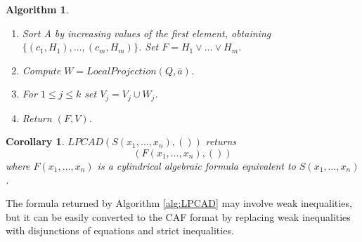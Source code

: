 \documentclass[english]{amsart}
\numberwithin{equation}{section}
\numberwithin{figure}{section}
\newtheorem{algorithm}[thm]{Algorithm}
\newtheorem{cor}[thm]{Corollary}
\begin{document}
\begin{algorithm}
\begin{enumerate}
\begin{enumerate}
\begin{enumerate}
\item $s_{1}=Root_{x_{k+1},p_{1}}f_{1}$ and $f_{1}\in W_{k+1}$ or $s_{1}=f_{1}\equiv-\infty$, 
\item $s_{2}=Root_{x_{k+1},p_{2}}f_{2}$ and $f_{2}\in W_{k+1}$ or $s_{2}=f_{2}\equiv\infty$, 
\item $v_{1}=s_{1}(\overline{a})$ and $v_{2}=s_{2}(\overline{a})$, 
\item either $v_{1}=v_{2}=a_{k+1}$ or $v_{1}<a_{k+1}<v_{2}$ and there
are no roots of elements of $W_{k+1}$ in $(v_{1},v_{2})$. 
\end{enumerate}
\item Set $Q=Q\cup(\{f_{1},f_{2}\}\setminus\{-\infty,\infty\})$.
\item If $v_{1}=v_{2}$ then set $G=(x_{k+1}=s_{1})$, add \[
(v_{1},s_{1},<,u_{2},r_{2},\rho_{2})\]
 and \[
(u_{1},r_{1},\rho_{1},v_{1},s_{1},<)\]
 to $stack$, and go to $(n)$.
\item If $u_{2}<v_{2}$ then set $t_{2}=r_{2}$ and $\sigma_{2}=\rho_{2}$.
Else set $t_{2}=s_{2}$ and $\sigma_{2}=<$, and if $u_{2}>v_{2}$
or $\rho_{2}=\leq$ add \[
(v_{2},s_{2},\leq,u_{2},r_{2},\rho_{2})\]
 to $stack$. 
\item If $v_{1}<u_{1}$ then set $t_{1}=r_{1}$ and $\sigma_{1}=\rho_{1}$.
Else set $t_{1}=s_{1}$ and $\sigma_{1}=<$, and if $v_{1}>u_{1}$
or $\rho_{1}=\leq$ add \[
(u_{1},r_{1},\rho_{1},v_{1},s_{1},\leq)\]
 to $stack$. 
\item Set $G=(t_{1}\sigma_{1}x_{k+1}\sigma_{2}t_{2})$.
\item Set $A=A\cup\{(a_{k+1},G\wedge H)\}$
\end{enumerate}
\item Sort A by increasing values of the first element, obtaining $\{(c_{1},H_{1}),\ldots,(c_{m},H_{m})\}$.
Set $F=H_{1}\vee\ldots\vee H_{m}$.
\item Compute $W=LocalProjection(Q,\overline{a})$.
\item For $1\leq j\leq k$ set $V_{j}=V_{j}\cup W_{j}$.
\item Return\emph{ $(F,V)$.}
\end{enumerate}
\end{algorithm}
\begin{cor}
$LPCAD(S(x_{1},\ldots,x_{n}),())$ returns \[
(F(x_{1},\ldots,x_{n}),())\]
where $F(x_{1},\ldots,x_{n})$ is a cylindrical algebraic formula
equivalent to $S(x_{1},\ldots,x_{n})$.
\end{cor}
The formula returned by Algorithm \ref{alg:LPCAD} may involve weak
inequalities, but it can be easily converted to the CAF format by
replacing weak inequalities with disjunctions of equations and strict
inequalities.
\end{document}
